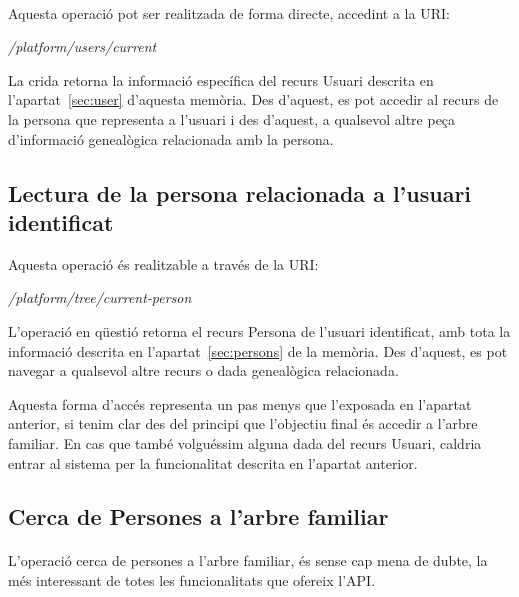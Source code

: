         \paragraph{}
        Aquesta operació pot ser realitzada de forma directe, accedint a la URI:

        \begin{displayquote}
            \emph{/platform/users/current}
        \end{displayquote}

        La crida retorna la informació específica del recurs Usuari descrita en l'apartat~\ref{sec:user} d'aquesta memòria. Des d'aquest, es pot accedir al recurs de la persona que re\-pre\-sen\-ta a l'usuari i des d’aquest, a qualsevol altre peça d'informació genealògica relacionada amb la persona.


    \subsection{Lectura de la persona relacionada a l'usuari identificat}

        Aquesta operació és realitzable a través de la URI:

        \begin{displayquote}
            \emph{/platform/tree/current-person}
        \end{displayquote}

        L'operació en qüestió retorna el recurs Persona de l'usuari identificat, amb tota la informació descrita en l'apartat~\ref{sec:persons} de la memòria. Des d'aquest, es pot navegar a qualsevol altre recurs o dada genealògica relacionada.

        Aquesta forma d'accés representa un pas menys que l’exposada en l’apartat anterior, si tenim clar des del principi que l'objectiu final és accedir a l'arbre familiar. En cas que també volguéssim alguna dada del recurs Usuari, caldria entrar al sistema per la funcionalitat descrita en l'apartat anterior.


    \subsection{Cerca de Persones a l'arbre familiar}\label{sec:searchParams}

        \paragraph{}
        L'operació cerca de persones a l'arbre familiar, és sense cap mena de dubte, la més interessant de totes les funcionalitats que ofereix l'API.

